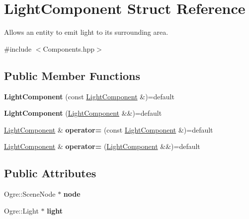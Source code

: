 \hypertarget{struct_light_component}{}\section{Light\+Component Struct Reference}
\label{struct_light_component}


Allows an entity to emit light to it\textquotesingle{}s surrounding area.  




{\ttfamily \#include $<$Components.\+hpp$>$}

\subsection*{Public Member Functions}
\begin{DoxyCompactItemize}
\item 
{\bfseries Light\+Component} (const \hyperlink{struct_light_component}{Light\+Component} \&)=default\hypertarget{struct_light_component_a179937f38c9f7a15b104ada3af8da472}{}\label{struct_light_component_a179937f38c9f7a15b104ada3af8da472}

\item 
{\bfseries Light\+Component} (\hyperlink{struct_light_component}{Light\+Component} \&\&)=default\hypertarget{struct_light_component_a95ea0325371c3ad95b0a567484419dd3}{}\label{struct_light_component_a95ea0325371c3ad95b0a567484419dd3}

\item 
\hyperlink{struct_light_component}{Light\+Component} \& {\bfseries operator=} (const \hyperlink{struct_light_component}{Light\+Component} \&)=default\hypertarget{struct_light_component_add309e16a4d282952e52a0d354f5c290}{}\label{struct_light_component_add309e16a4d282952e52a0d354f5c290}

\item 
\hyperlink{struct_light_component}{Light\+Component} \& {\bfseries operator=} (\hyperlink{struct_light_component}{Light\+Component} \&\&)=default\hypertarget{struct_light_component_af03a690e9e9b70a34f7dbda80d07f8b7}{}\label{struct_light_component_af03a690e9e9b70a34f7dbda80d07f8b7}

\end{DoxyCompactItemize}
\subsection*{Public Attributes}
\begin{DoxyCompactItemize}
\item 
Ogre\+::\+Scene\+Node $\ast$ {\bfseries node}\hypertarget{struct_light_component_af0376f045845ff28decf09fc2c89064a}{}\label{struct_light_component_af0376f045845ff28decf09fc2c89064a}

\item 
Ogre\+::\+Light $\ast$ {\bfseries light}\hypertarget{struct_light_component_a24973661f3fd0b9577308c8991999ff3}{}\label{struct_light_component_a24973661f3fd0b9577308c8991999ff3}

\end{DoxyCompactItemize}
